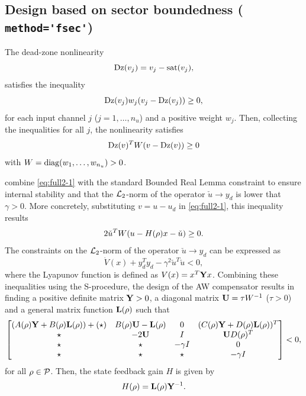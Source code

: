 \documentclass[fleqn,11pt]{article}
\newcommand{\lcode}[1]{\textbf{%
    \lstinline[style=mystyle]{#1}}}
\begin{document}
\subsection{Design based on sector boundedness (\lcode{method='fsec'})}\label{sec:fsec}

The dead-zone nonlinearity
\begin{equation*}
    \mathrm{Dz}(v_j) = v_j - \mathrm{sat}(v_j),
\end{equation*}
satisfies the inequality
\begin{equation*}
    \mathrm{Dz}(v_j)w_j(v_j-\mathrm{Dz}(v_j))\geq0,
\end{equation*}
for each input channel $j$ ($j=1,\dots,n_u$) and a positive weight $w_j$. Then, collecting the inequalities for all $j$, the nonlinearity satisfies
\begin{equation}\label{eq:full2-1}
    \mathrm{Dz}(v)^TW(v-\mathrm{Dz}(v))\geq0
\end{equation}
with $W=\mathrm{diag}(w_1,\dots,w_{n_u})>0$.

\citet{Skogestad2005} combine \cref{eq:full2-1} with the standard Bounded Real Lemma constraint to ensure internal stability and that the $\mathcal{L}_2$-norm of the operator $\check{u}\to y_d$ is lower that $\gamma>0$. More concretely, substituting $v=u-u_d$ in \cref{eq:full2-1}, this inequality results
\begin{equation}\label{eq:full2-2}
    2\check{u}^TW(u-H(\rho)x-\check{u})\geq0.
\end{equation}
The constraints on the $\mathcal{L}_2$-norm of the operator $\check{u}\to y_d$ can be expressed as
\begin{equation}\label{eq:full2-3}
    \dot{V}(x)+y_d^Ty_d-\gamma^2\check{u}^T\check{u}<0,
\end{equation}
where the Lyapunov function is defined as $V(x)=x^T\mathbf{Y} x$. Combining these inequalities using the S-procedure, the design of the AW compensator results in finding a positive definite matrix $\mathbf{Y}>0$, a diagonal matrix $\mathbf{U}=\tau W^{-1}$ ($\tau>0$) and a general matrix function $\mathbf{L}(\rho)$ such that
\begin{equation}\label{eq:lmi_FSEC}
    \begin{bmatrix}
    (A(\rho)\mathbf{Y}+B(\rho)\mathbf{L}(\rho))+(\star) & B(\rho)\mathbf{U}-\mathbf{L}(\rho) & 0 & (C(\rho)\mathbf{Y}+D(\rho)\mathbf{L}(\rho))^T\\
    \star & -2\mathbf{U} & I & \mathbf{U} D(\rho)^T\\
    \star & \star & -\gamma I & 0\\
    \star & \star & \star & -\gamma I
    \end{bmatrix}<0,
\end{equation}
for all $\rho\in\mathcal{P}$. Then, the state feedback gain $H$ is given by
\begin{equation*}
    H(\rho)=\mathbf{L}(\rho)\mathbf{Y}^{-1}.
\end{equation*}
\end{document}
